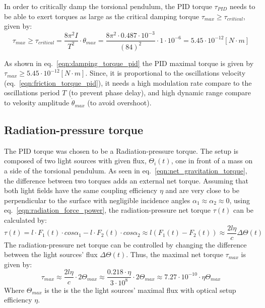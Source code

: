 \documentclass[\main/master.tex]{subfiles}
\begin{document}
In order to critically damp the torsional pendulum, the PID torque $\tau_{PID}$ needs to be able to exert torques as large as the critical damping torque $\tau_{max} \geq  \tau_{critical}$, given by:
\begin{equation}
\tau_{max} \geq  \tau_{critical} = \frac{ 8 \pi^2 I }{T^2}\cdot\theta_{max} = \frac{ 8 \pi^2 \cdot 0.487\cdot10^{-3} }{(84)^2}\cdot 1\cdot10^{-6} = 5.45\cdot10^{-12}[N\cdot m]
\label{eqn:damping_torque_pid}
\end{equation}
\par\noindent
As shown in  eq.~\ref{eqn:damping_torque_pid} the PID maximal torque is given by $\tau_{max} \geq 5.45\cdot10^{-12}[N\cdot m]$. Since, it is proportional to the oscillations velocity (eq.~\ref{eqn:friction_torque_pid}), it needs a high modulation rate compare to the oscillations period $T$ (to prevent phase delay), and high dynamic range compare to velosity amplitude $\dot{\theta}_{max}$ (to avoid overshoot). 
\subsection{Radiation-pressure torque}
The PID torque was chosen to be a Radiation-pressure torque. The setup is composed of two light sources with given flux, $\Theta_i(t)$, one in front of a mass on a side of the torsional pendulum. As seen in eq.~\ref{eqn:net_gravitation_torque}, the difference between two torques adds an external net torque. Assuming that both light fields have the same coupling efficiency $\eta$ and are very close to be perpendicular to the surface with negligible incidence angles $\alpha_1\approx\alpha_2\approx 0$, using eq.~\ref{eqn:radiation_force_power}, the radiation-pressure net torque $\tau(t)$ can be calculated by:  
\begin{equation}
\tau(t) = l\cdot F_1(t) \cdot cos\alpha_1 - l\cdot F_2(t) \cdot cos\alpha_2\approx l(F_1(t) - F_2(t)) \approx \frac{2l\eta}{{c}} \Delta \Theta(t) \label{eqn:radiation torque}
\end{equation}
The radiation-pressure net torque can be controlled by changing the difference between the light sources' flux $\Delta \Theta(t)$. Thus, the maximal net torque $\tau_{max}$ is given by: 
\begin{equation}
\tau_{max}  \approx \frac{2l\eta}{{c}} \cdot 2 \Theta_{max} \approx \frac{0.218\cdot \eta}{{3\cdot10^{8}}} \cdot 2 \Theta_{max} \approx 7.27\cdot10^{-10} \cdot \eta\Theta_{max}   \label{eqn:max radiation torque}
\end{equation}
Where $\Theta_{max}$ is the is the the light sources' maximal flux with optical setup efficiency $\eta$. 
\end{document}
